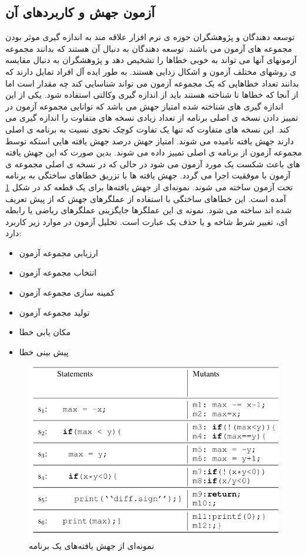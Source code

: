 
\subsection{آزمون جهش و کاربردهای آن}
توسعه دهندگان و پژوهشگران حوزه ی نرم افزار علاقه مند به اندازه گیری موثر بودن مجموعه های آزمون می باشند. توسعه دهندگان به دنبال آن هستند که بدانند مجموعه آزمونهای آنها می تواند به خوبی خطاها را تشخیص دهد و پژوهشگران به دنبال مقایسه ی روشهای مختلف آزمون و اشکال زدایی  هستند. به طور ایده آل افراد تمایل دارند که بدانند تعداد خطاهایی که یک مجموعه آزمون می تواند شناسایی کند چه مقدار است اما از آنجا که خطاها نا شناخته هستند باید از اندازه گیری وکالتی  استفاده شود. یکی از این اندازه گیری های شناخته شده امتیاز جهش  می باشد که توانایی مجموعه آزمون در تمییز دادن نسخه ی اصلی برنامه از تعداد زیادی نسخه های متفاوت را اندازه گیری می کند. این نسخه های متفاوت که تنها یک تفاوت کوچک نحوی نسبت به برنامه ی اصلی دارند جهش یافته  نامیده می شوند. امتیاز جهش درصد جهش یافته هایی  استکه توسط مجموعه آزمون از برنامه ی اصلی تمییز داده می شوند. بدین صورت که این جهش یافته های باعث شکست یک مورد آزمون می شود در حالی که در نسخه ی اصلی مجموعه ی آزمون با موفقیت اجرا می گردد. جهش یافته ها با تزریق خطاهای ساختگی به برنامه تحت آزمون  ساخته می شوند.  نمونه‌ای از  جهش یافته‌ها  برای یک قطعه کد در شکل \ref{fig:mutant} آمده است. این خطاهای ساختگی با استفاده از عملگرهای جهش که از پیش تعریف شده اند ساخته می شود. نمونه ی این عملگرها جایگزینی عملگرهای ریاضی یا رابطه ای، تغییر شرط شاخه  و یا حذف یک عبارت است\cite{just2014mutants}. تحلیل آزمون در موارد زیر کاربرد دارد:
\begin{itemize}
	\setlength\itemsep{.01em}	
	\item 
	ارزیابی مجموعه آزمون
	\item 
	انتخاب مجموعه آزمون
	\item 
	 کمینه سازی مجموعه آزمون
	\item 
	 تولید مجموعه آزمون
	\item 
	مکان یابی خطا
	\item 
	پیش بینی خطا
\end{itemize}

\begin{figure}[H]
	\centering
	\includegraphics[width=.6\textwidth]{images/mutants.PNG}
	\caption{ نمونه‌ای از جهش یافته‌های یک برنامه \cite{moon2014ask}}
	\label{fig:mutant}
\end{figure}

